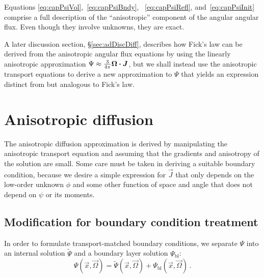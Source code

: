 Equations \eqref{eq:capPsiVol},~\eqref{eq:capPsiBndy},%
~\eqref{eq:capPsiRefl}, and~\eqref{eq:capPsiInit}
comprise a full description of the ``anisotropic'' component of the angular
angular flux. Even though they involve unknowns, they are exact.

A later discussion section, \S\ref{sec:adDiscDiff}, describes how Fick's law can
be derived from the anisotropic angular flux equations
by using the linearly anisotropic approximation \mbox{$\Psi\approx \frac{3}{4\pi}
\bm{\Omega}\bm{\cdot}\bm{J}$}, but we shall instead use the anisotropic transport
equations to
derive a new approximation to $\Psi$ that yields an expression distinct from but 
analogous to Fick's law.

\section{Anisotropic diffusion}
The anisotropic diffusion approximation is derived by manipulating the
anisotropic transport equation and assuming that the gradients and anisotropy
of the solution are small. Some care must be taken in deriving
a suitable boundary condition, because we desire a simple expression for
$\vec{J}$ that only depends on the low-order unknown $\phi$ and some other
function of space and angle that does not depend on $\psi$ or its moments.

\subsection{Modification for boundary condition treatment}
In order to formulate transport-matched boundary conditions, we separate $\Psi$
into an internal solution $\tilde\Psi$ and a boundary layer solution
$\Psi_\mathrm{bl}$:
\begin{equation} \label{eq:boundaryLayerPsi}
  \Psi(\vec{x}, \vec{\Omega})
  = \tilde\Psi(\vec{x}, \vec{\Omega})
  + \Psi_\mathrm{bl}(\vec{x}, \vec{\Omega})\,.
\end{equation}

